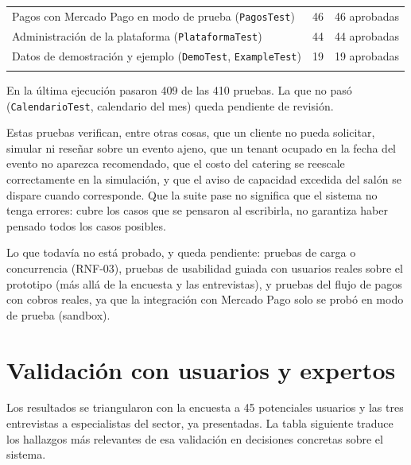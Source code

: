 \begin{table}[H]
\begin{tabularx}{\textwidth}{L r r}
        Pagos con Mercado Pago en modo de prueba (\texttt{PagosTest}) & 46 & 46 aprobadas \\
        Administración de la plataforma (\texttt{PlataformaTest}) & 44 & 44 aprobadas \\
        Datos de demostración y ejemplo (\texttt{DemoTest}, \texttt{ExampleTest}) & 19 & 19 aprobadas \\
        \midrule
         &  &  \\
        \bottomrule
    \end{tabularx}
\end{table}

En la última ejecución pasaron 409 de las 410 pruebas. La que no pasó (\texttt{CalendarioTest}, calendario del mes) queda pendiente de revisión.

Estas pruebas verifican, entre otras cosas, que un cliente no pueda
solicitar, simular ni reseñar sobre un evento ajeno, que un tenant
ocupado en la fecha del evento no aparezca recomendado, que el costo del
catering se reescale correctamente en la simulación, y que el aviso de
capacidad excedida del salón se dispare cuando corresponde. Que la suite
pase no significa que el sistema no tenga errores: cubre los casos que
se pensaron al escribirla, no garantiza haber pensado todos los casos
posibles.

Lo que todavía no está probado, y queda pendiente: pruebas de carga o
concurrencia (RNF-03), pruebas de usabilidad guiada con usuarios reales
sobre el prototipo (más allá de la encuesta y las entrevistas), y
pruebas del flujo de pagos con cobros reales, ya que la integración
con Mercado Pago solo se probó en modo de prueba (sandbox).

\section{Validación con usuarios y expertos}\label{sec:validacion}

Los resultados se triangularon con la encuesta a 45 potenciales usuarios
y las tres entrevistas a especialistas del sector, ya presentadas. La
tabla siguiente traduce los hallazgos más relevantes de esa validación
en decisiones concretas sobre el sistema.

